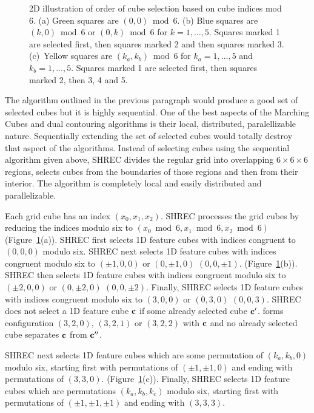 \begin{figure}[t]
\caption{2D illustration of order of cube selection based 
on cube indices mod 6.
(a) Green squares are $(0,0) \bmod 6$.
(b) Blue squares are $(k,0) \bmod 6$ or $(0,k) \bmod 6$ for $k=1,\ldots,5$.
Squares marked 1 are selected first, then squares marked 2
and then squares marked 3.
(c)~Yellow squares are $(k_a,k_b) \bmod 6$ for $k_a=1,\ldots,5$
and $k_b=1,\ldots,5$.
Squares marked 1 are selected first, then squares marked 2,
then 3, 4 and 5.
}
\label{fig:mod6}
\end{figure}

The algorithm outlined in the previous paragraph would produce
a good set of selected cubes but it is highly sequential.
One of the best aspects of the Marching Cubes and dual contouring algorithms
is their local, distributed, paralellizable nature.
Sequentially extending the set of selected cubes would totally destroy
that aspect of the algorithms.
Instead of selecting cubes using the sequential algorithm given above,
SHREC divides the regular grid 
into overlapping $6 \times 6 \times 6$ regions,
selects cubes from the boundaries of those regions and then from their interior.
The algorithm is completely local and easily distributed and parallelizable.

Each grid cube has an index $(x_0, x_1, x_2)$.
SHREC processes the grid cubes by reducing the indices modulo six
to $(x_0 \bmod 6, x_1 \bmod 6, x_2 \bmod 6)$ (Figure~\ref{fig:mod6}(a)).
SHREC first selects 1D feature cubes 
with indices congruent to $(0,0,0)$ modulo six.
SHREC next selects 1D feature cubes with indices congruent modulo six
to $(\pm 1,0,0)$ or $(0, \pm 1, 0)$ $(0, 0, \pm 1)$.
(Figure~\ref{fig:mod6}(b)).
SHREC then selects 1D feature cubes with indices congruent modulo six
to $(\pm 2,0,0)$ or $(0, \pm 2, 0)$ $(0, 0, \pm 2)$.
Finally, SHREC selects 1D feature cubes with indices congruent modulo six
to $(3,0,0)$ or $(0, 3, 0)$ $(0, 0, 3)$.
SHREC does not select a 1D feature cube $\mathbf{c}$ 
if some already selected cube $\mathbf{c}'$.
forms configuration $(3,2,0)$, $(3,2,1)$ or $(3,2,2)$ with $\mathbf{c}$
and no already selected cube separates $\mathbf{c}$ from $\mathbf{c}''$.

SHREC next selects 1D feature cubes which are some permutation
of $(k_a,k_b,0)$ modulo six,
starting first with permutations of $(\pm 1, \pm 1, 0)$
and ending with permutations of $(3, 3, 0)$.
(Figure~\ref{fig:mod6}(c)).
Finally, SHREC selects 1D feature cubes which are permutations
$(k_a, k_b, k_c)$ modulo six,
starting first with permutations of $(\pm 1, \pm 1, \pm 1)$
and ending with $(3, 3, 3)$.

